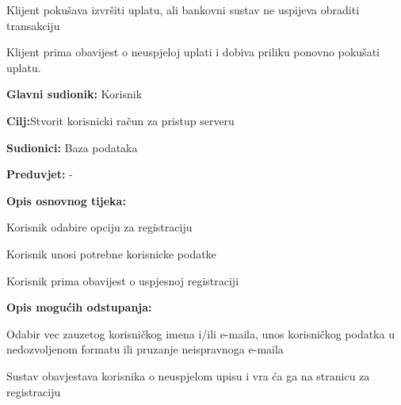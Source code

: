 {\begin{packed_item}
\begin{packed_item}
		\item[3.a] Klijent pokušava izvršiti uplatu, ali bankovni sustav ne uspijeva obraditi transakciju
		\item[] \begin{packed_enum}
			
			\item Klijent prima obavijest o neuspjeloj uplati i dobiva priliku ponovno pokušati uplatu.
			
		\end{packed_enum}
		
	\end{packed_item}
	
\end{packed_item}

\noindent {}
\begin{packed_item}
	
	\item \textbf{Glavni sudionik: } Korisnik
	\item  \textbf{Cilj:}Stvorit korisnicki račun za pristup serveru
	\item  \textbf{Sudionici:} Baza podataka
	\item  \textbf{Preduvjet:} -
	\item  \textbf{Opis osnovnog tijeka:}
	
	\item[] \begin{packed_enum}
		
		\item Korisnik odabire opciju za registraciju
		\item Korisnik unosi potrebne korisnicke podatke
		\item Korisnik prima obavijest o uspjesnoj registraciji
		
	\end{packed_enum}
	\newpage
		\item  \textbf{Opis mogućih odstupanja:}
	\item[] \begin{packed_item}
		
		\item[2.a] Odabir vec zauzetog korisničkog imena i/ili e-maila, unos korisničkog podatka u nedozvoljenom formatu ili pruzanje neispravnoga e-maila
		\item[] \begin{packed_enum}
			
			\item {Sustav obavjestava korisnika o neuspjelom upisu i vra ća ga na stranicu za registraciju} 
			

\end{packed_enum}
\end{packed_item}
\end{packed_item}}
